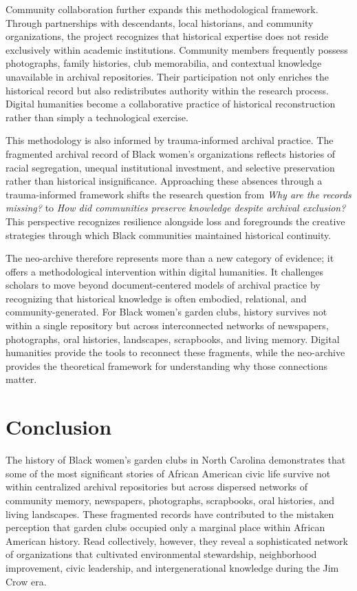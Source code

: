 \documentclass[final]{anthology-ch}
\begin{document}
Community collaboration further expands this methodological framework. Through partnerships with descendants, local historians, and community organizations, the project recognizes that historical expertise does not reside exclusively within academic institutions. Community members frequently possess photographs, family histories, club memorabilia, and contextual knowledge unavailable in archival repositories. Their participation not only enriches the historical record but also redistributes authority within the research process. Digital humanities become a collaborative practice of historical reconstruction rather than simply a technological exercise.

This methodology is also informed by trauma-informed archival practice. The fragmented archival record of Black women's organizations reflects histories of racial segregation, unequal institutional investment, and selective preservation rather than historical insignificance. Approaching these absences through a trauma-informed framework shifts the research question from \textit{Why are the records missing?} to \textit{How did communities preserve knowledge despite archival exclusion?} This perspective recognizes resilience alongside loss and foregrounds the creative strategies through which Black communities maintained historical continuity.

The neo-archive therefore represents more than a new category of evidence; it offers a methodological intervention within digital humanities. It challenges scholars to move beyond document-centered models of archival practice by recognizing that historical knowledge is often embodied, relational, and community-generated. For Black women's garden clubs, history survives not within a single repository but across interconnected networks of newspapers, photographs, oral histories, landscapes, scrapbooks, and living memory. Digital humanities provide the tools to reconnect these fragments, while the neo-archive provides the theoretical framework for understanding why those connections matter.

\section{Conclusion} \label{sec:conclusion}

The history of Black women's garden clubs in North Carolina demonstrates that some of the most significant stories of African American civic life survive not within centralized archival repositories but across dispersed networks of community memory, newspapers, photographs, scrapbooks, oral histories, and living landscapes. These fragmented records have contributed to the mistaken perception that garden clubs occupied only a marginal place within African American history. Read collectively, however, they reveal a sophisticated network of organizations that cultivated environmental stewardship, neighborhood improvement, civic leadership, and intergenerational knowledge during the Jim Crow era.
\end{document}
